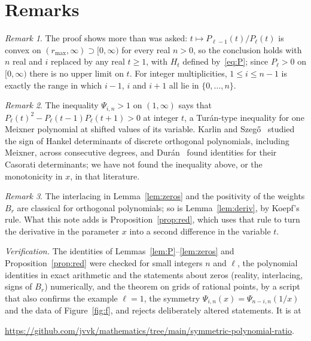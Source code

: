 \documentclass[11pt]{amsart}
\theoremstyle{remark}
\newtheorem{remark}{Remark}
\begin{document}
\section{Remarks}

\begin{remark}
The proof shows more than was asked: $t\mapsto P_{\ell-1}(t)/P_\ell(t)$ is convex on $(r_{\max},\infty)\supset[0,\infty)$ for every real $n>0$, so the conclusion holds with $n$ real and $i$ replaced by any real $t\ge1$, with $H_t$ defined by~\eqref{eq:P}; since $P_\ell>0$ on $[0,\infty)$ there is no upper limit on $t$. For integer multiplicities, $1\le i\le n-1$ is exactly the range in which $i-1$, $i$ and $i+1$ all lie in $\{0,\dots,n\}$.
\end{remark}

\begin{remark}
The inequality $\Psi_{i,n}>1$ on $(1,\infty)$ says that $P_\ell(t)^2-P_\ell(t-1)P_\ell(t+1)>0$ at integer $t$, a Tur\'an-type inequality for one Meixner polynomial at shifted values of its variable. Karlin and Szeg\H{o}~\cite{KS} studied the sign of Hankel determinants of discrete orthogonal polynomials, including Meixner, across consecutive degrees, and Dur\'an~\cite{Duran} found identities for their Casorati determinants; we have not found the inequality above, or the monotonicity in $x$, in that literature.
\end{remark}

\begin{remark}
The interlacing in Lemma~\ref{lem:zeros} and the positivity of the weights $B_r$ are classical for orthogonal polynomials; so is Lemma~\ref{lem:deriv}, by Koepf's rule. What this note adds is Proposition~\ref{prop:red}, which uses that rule to turn the derivative in the parameter $x$ into a second difference in the variable $t$.
\end{remark}

\emph{Verification.} The identities of Lemmas~\ref{lem:P}--\ref{lem:zeros} and Proposition~\ref{prop:red} were checked for small integers $n$ and $\ell$, the polynomial identities in exact arithmetic and the statements about zeros (reality, interlacing, signs of $B_r$) numerically, and the theorem on grids of rational points, by a script that also confirms the example $\ell=1$, the symmetry $\Psi_{i,n}(x)=\Psi_{n-i,n}(1/x)$ and the data of Figure~\ref{fig:f}, and rejects deliberately altered statements. It is at
\begin{center}\small\url{https://github.com/jvvk/mathematics/tree/main/symmetric-polynomial-ratio}.\end{center}
\end{document}
